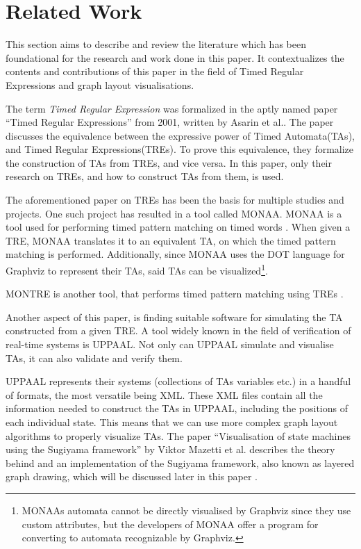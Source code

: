 \section{Related Work}\label{sec:related work}



This section aims to describe and review the literature which has been foundational for the research and work done in this paper. It contextualizes the contents and contributions of this paper in the field of Timed Regular Expressions and graph layout visualisations.

The term \textit{Timed Regular Expression} was formalized in the aptly named paper ``Timed Regular Expressions'' from 2001, written by Asarin et al.\cite{Eugene2001}. The paper discusses the equivalence between the expressive power of Timed Automata(TAs)\cite{ALUR1994}, and Timed Regular Expressions(TREs). To prove this equivalence, they formalize the construction of TAs from TREs, and vice versa. In this paper, only their research on TREs, and how to construct TAs from them, is used.

The aforementioned paper on TREs has been the basis for multiple studies and projects. One such project has resulted in a tool called MONAA. MONAA is a tool used for performing timed pattern matching on timed words \cite{MONAA2017}\cite{MONAAPAPER2018}. When given a TRE, MONAA translates it to an equivalent TA, on which the timed pattern matching is performed. Additionally, since MONAA uses the DOT language for Graphviz \cite{Graphviz} to represent their TAs, said TAs can be visualized\footnote{MONAAs automata cannot be directly visualised by Graphviz since they use custom attributes, but the developers of MONAA offer a program for converting to automata recognizable by Graphviz\cite{MONAA2017}.}.

MONTRE is another tool, that performs timed pattern matching using TREs \cite{MONTRE2016}.

Another aspect of this paper, is finding suitable software for simulating the TA constructed from a given TRE. A tool widely known in the field of verification of real-time systems is UPPAAL. Not only can UPPAAL simulate and visualise TAs, it can also validate and verify them\cite{UPPAAL}.

UPPAAL represents their systems (collections of TAs variables etc.) in a handful of formats, the most versatile being XML\cite{UPPAAL}. These XML files contain all the information needed to construct the TAs in UPPAAL, including the positions of each individual state. This means that we can use more complex graph layout algorithms to properly visualize TAs. The paper ``Visualisation of state machines using the Sugiyama framework'' by Viktor Mazetti et al. describes the theory behind and an implementation of the Sugiyama framework, also known as layered graph drawing, which will be discussed later in this paper \cite{Mazetti2012}.